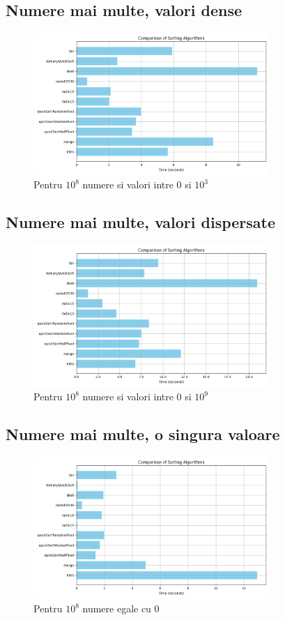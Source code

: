 \documentclass[12pt]{article}
\begin{document}
\subsection{Numere mai multe, valori dense}
\begin{figure}[H]
    \centering
    \includegraphics[width=0.8\textwidth]{./img/img_20250417_022629.png} %
    \caption{Pentru $10^8$ numere si valori intre 0 si $10^3$}
\end{figure}
\subsection{Numere mai multe, valori dispersate}
\begin{figure}[H]
    \centering
    \includegraphics[width=0.8\textwidth]{./img/img_20250417_022859.png} %
    \caption{Pentru $10^8$ numere si valori intre 0 si $10^9$}
\end{figure}
\subsection{Numere mai multe, o singura valoare}
\begin{figure}[H]
    \centering
    \includegraphics[width=0.8\textwidth]{./img/img_20250417_023613.png} %
    \caption{Pentru $10^8$ numere egale cu 0}
\end{figure}
\end{document}
